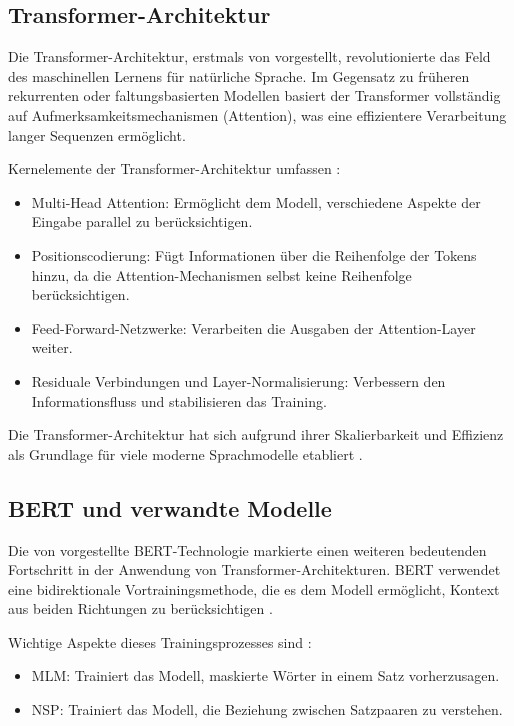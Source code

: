 \subsection{Transformer-Architektur}
\label{subsec:transformer-architecture}

Die Transformer-Architektur, erstmals von \textcite{VaswaniAshish2023AIAY} vorgestellt, revolutionierte das Feld des maschinellen Lernens für natürliche Sprache. Im Gegensatz zu früheren rekurrenten oder faltungsbasierten Modellen basiert der Transformer vollständig auf Aufmerksamkeitsmechanismen (Attention), was eine effizientere Verarbeitung langer Sequenzen ermöglicht.

Kernelemente der Transformer-Architektur umfassen \cite{VaswaniAshish2023AIAY}:

\begin{itemize}
	\item Multi-Head Attention: Ermöglicht dem Modell, verschiedene Aspekte der Eingabe parallel zu berücksichtigen.
	\item Positionscodierung: Fügt Informationen über die Reihenfolge der Tokens hinzu, da die Attention-Mechanismen selbst keine Reihenfolge berücksichtigen.
	\item Feed-Forward-Netzwerke: Verarbeiten die Ausgaben der Attention-Layer weiter.
	\item Residuale Verbindungen und Layer-Normalisierung: Verbessern den Informationsfluss und stabilisieren das Training.
\end{itemize}

Die Transformer-Architektur hat sich aufgrund ihrer Skalierbarkeit und Effizienz als Grundlage für viele moderne Sprachmodelle etabliert \cite{VaswaniAshish2023AIAY}.

\subsection{BERT und verwandte Modelle}
\label{subsec:bert-und-verwandte-modelle}

Die von \textcite{DevlinJacob2019BPoD} vorgestellte \gls{BERT}-Technologie markierte einen weiteren bedeutenden Fortschritt in der Anwendung von Transformer-Architekturen. BERT verwendet eine bidirektionale Vortrainingsmethode, die es dem Modell ermöglicht, Kontext aus beiden Richtungen zu berücksichtigen \cite{DevlinJacob2019BPoD}.

Wichtige Aspekte dieses Trainingsprozesses sind \cite{DevlinJacob2019BPoD}:

\begin{itemize}
	\item \gls{MLM}: Trainiert das Modell, maskierte Wörter in einem Satz vorherzusagen.
	\item \gls{NSP}: Trainiert das Modell, die Beziehung zwischen Satzpaaren zu verstehen.
\end{itemize}

